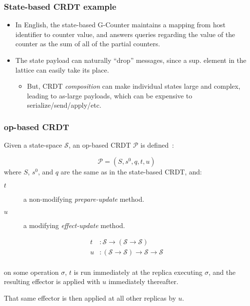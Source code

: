 \documentclass[aspectratio=169,compress]{beamer}
\begin{document}
  \begin{frame}
    \frametitle{State-based CRDT example}

    \begin{itemize}
      \item In English, the state-based G-Counter maintains a mapping from host
        identifier to counter value, and answers queries regarding the value of
        the counter as the sum of all of the partial counters.
      \item The state payload can naturally ``drop'' messages, since a sup.
        element in the lattice can easily take its place.
        \begin{itemize}
          \item But, CRDT \textit{composition} can make individual states large
            and complex, leading to as-large payloads, which can be expensive to
            serialize/send/apply/etc.
        \end{itemize}
    \end{itemize}
  \end{frame}

  \begin{frame}
    \frametitle{op-based CRDT}

    Given a state-space $\mathcal{S}$, an op-based CRDT $\mathcal{P}$ is
    defined~\parencite{shapiro11}:

    \[
      \mathcal{P} = (S, s^0, q, t, u)
    \]
    where $S$, $s^0$, and $q$ are the same as in the state-based CRDT, and:
    \begin{description}
      \item[$t$] a non-modifying \textit{prepare-update} method.
      \item[$u$] a modifying \textit{effect-update} method.
    \end{description}

    \[
      \begin{aligned}
        t &: \mathcal{S} \to (\mathcal{S} \to \mathcal{S}) \\
        u &: (\mathcal{S} \to \mathcal{S}) \to \mathcal{S} \to \mathcal{S} \\
      \end{aligned}
    \]

    on some operation $\sigma$, $t$ is run immediately at the replica executing
    $\sigma$, and the resulting effector is applied with $u$ immediately
    thereafter.

    That same effector is then applied at all other replicas by $u$.
  \end{frame}
\end{document}
